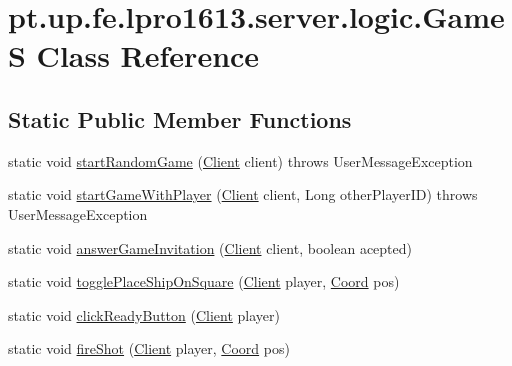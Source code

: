 \hypertarget{classpt_1_1up_1_1fe_1_1lpro1613_1_1server_1_1logic_1_1_game_s}{}\section{pt.\+up.\+fe.\+lpro1613.\+server.\+logic.\+GameS Class Reference}
\label{classpt_1_1up_1_1fe_1_1lpro1613_1_1server_1_1logic_1_1_game_s}
\subsection*{Static Public Member Functions}
\begin{DoxyCompactItemize}
\item 
static void \hyperlink{classpt_1_1up_1_1fe_1_1lpro1613_1_1server_1_1logic_1_1_game_s_ae5c542e43792b48f5fb164730ca69bb2}{start\+Random\+Game} (\hyperlink{classpt_1_1up_1_1fe_1_1lpro1613_1_1server_1_1conn_1_1_client}{Client} client)  throws User\+Message\+Exception 
\item 
static void \hyperlink{classpt_1_1up_1_1fe_1_1lpro1613_1_1server_1_1logic_1_1_game_s_a19226b02188cfd19dee0992b2ce6af7a}{start\+Game\+With\+Player} (\hyperlink{classpt_1_1up_1_1fe_1_1lpro1613_1_1server_1_1conn_1_1_client}{Client} client, Long other\+Player\+ID)  throws User\+Message\+Exception 
\item 
static void \hyperlink{classpt_1_1up_1_1fe_1_1lpro1613_1_1server_1_1logic_1_1_game_s_ae7f86b6c54f2a043f3f08560fd4ee7b5}{answer\+Game\+Invitation} (\hyperlink{classpt_1_1up_1_1fe_1_1lpro1613_1_1server_1_1conn_1_1_client}{Client} client, boolean acepted)
\item 
static void \hyperlink{classpt_1_1up_1_1fe_1_1lpro1613_1_1server_1_1logic_1_1_game_s_a23c0059ae1482561f185d2fe06fa4582}{toggle\+Place\+Ship\+On\+Square} (\hyperlink{classpt_1_1up_1_1fe_1_1lpro1613_1_1server_1_1conn_1_1_client}{Client} player, \hyperlink{classpt_1_1up_1_1fe_1_1lpro1613_1_1sharedlib_1_1utils_1_1_coord}{Coord} pos)
\item 
static void \hyperlink{classpt_1_1up_1_1fe_1_1lpro1613_1_1server_1_1logic_1_1_game_s_a3f0990efe67cd38218cba8877ddd075c}{click\+Ready\+Button} (\hyperlink{classpt_1_1up_1_1fe_1_1lpro1613_1_1server_1_1conn_1_1_client}{Client} player)
\item 
static void \hyperlink{classpt_1_1up_1_1fe_1_1lpro1613_1_1server_1_1logic_1_1_game_s_aacc27bbcb911c57f6a22d8995dbb2b71}{fire\+Shot} (\hyperlink{classpt_1_1up_1_1fe_1_1lpro1613_1_1server_1_1conn_1_1_client}{Client} player, \hyperlink{classpt_1_1up_1_1fe_1_1lpro1613_1_1sharedlib_1_1utils_1_1_coord}{Coord} pos)

\end{DoxyCompactItemize}
